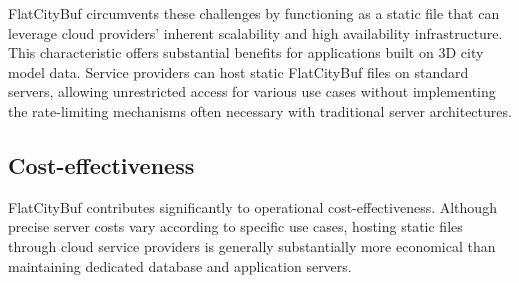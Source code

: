 FlatCityBuf circumvents these challenges by functioning as a static file that can leverage cloud providers' inherent scalability and high availability infrastructure. This characteristic offers substantial benefits for applications built on 3D city model data. Service providers can host static FlatCityBuf files on standard servers, allowing unrestricted access for various use cases without implementing the rate-limiting mechanisms often necessary with traditional server architectures.

\subsection{Cost-effectiveness}
\label{cost_effectiveness}

FlatCityBuf contributes significantly to operational cost-effectiveness. Although precise server costs vary according to specific use cases, hosting static files through cloud service providers is generally substantially more economical than maintaining dedicated database and application servers.

